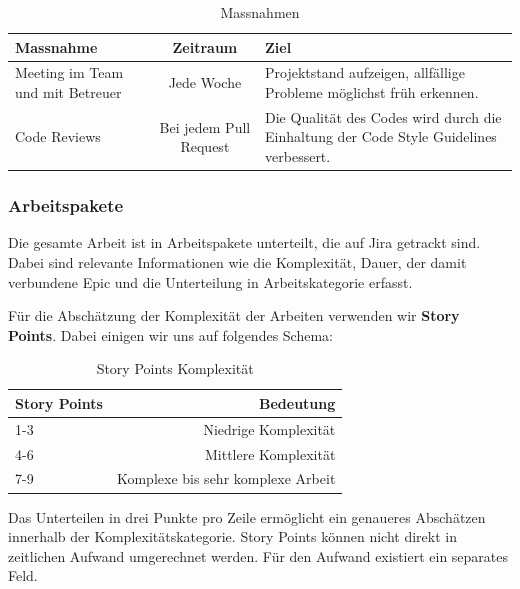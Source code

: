 \renewcommand{\arraystretch}{2}
\begin{table}[h]
  \begin{tabular}{ | p{3cm} | c | p{5.5cm} | }
  	\hline
    \textbf{Massnahme}			& \textbf{Zeitraum}	 	& \textbf{Ziel} \\
    \hline
    Meeting im Team und mit Betreuer & Jede Woche & Projektstand aufzeigen, allfällige Probleme möglichst früh erkennen.\\
    \hline
    Code Reviews & Bei jedem Pull Request & Die Qualität des Codes wird durch die Einhaltung der Code Style Guidelines verbessert.\\
    \hline
  \end{tabular}
  \caption[Projektplan]{Massnahmen}
  \label{tab:Massnahmen}
\end{table}

\subsubsection{Arbeitspakete}
Die gesamte Arbeit ist in Arbeitspakete unterteilt, die auf Jira getrackt sind. Dabei sind relevante Informationen wie die Komplexität, Dauer, der damit verbundene Epic und die Unterteilung in Arbeitskategorie erfasst.

Für die Abschätzung der Komplexität der Arbeiten verwenden wir \textbf{Story Points}. Dabei einigen wir uns auf folgendes Schema:

\renewcommand{\arraystretch}{1.5}
\begin{table}[h]
	\centering
	\begin{tabular}{| l | r |}
		\hline
		\textbf{Story Points} & \textbf{Bedeutung}\\
		\hline
		1-3 & Niedrige Komplexität \\
		4-6 & Mittlere Komplexität \\
		7-9 & Komplexe bis sehr komplexe Arbeit\\
		\hline
	\end{tabular}
	\caption[Story-Points]{Story Points Komplexität}
	\label{tab:story-points}
\end{table}
Das Unterteilen in drei Punkte pro Zeile ermöglicht ein genaueres Abschätzen innerhalb der Komplexitätskategorie. Story Points können nicht direkt in zeitlichen Aufwand umgerechnet werden. Für den Aufwand existiert ein separates Feld.

